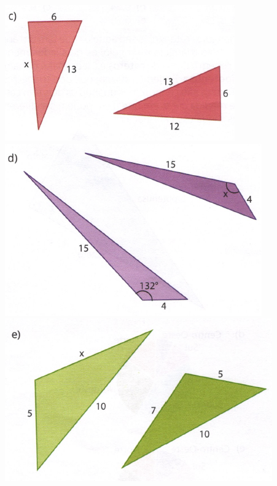 \documentclass[a4paper,14pt]{article}
\begin{document}
\begin{multicols}{2}
\begin{enumerate}
			\includegraphics[width=1\linewidth]{6FMA123_imagens/imagem9}\\
			\includegraphics[width=1\linewidth]{6FMA123_imagens/imagem10}\\
			\includegraphics[width=1\linewidth]{6FMA123_imagens/imagem11}\\

\end{enumerate}
\end{multicols}
\end{document}
